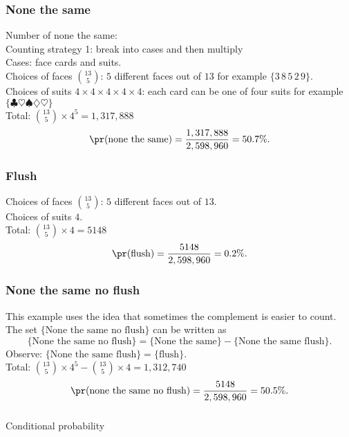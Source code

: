 \begin{frame}[fragile]\frametitle{None the same}

Number of none the same: \\ 

Counting strategy 1: break into cases and then multiply \\
Cases: face cards and suits. \\ 
Choices of faces $\binom{13}{5}$: $5$ different faces out of $13$ for
example $\{3 \,8 \, 5 \, 2 \, 9\}$. \\ 
Choices of suits $4 \times 4 \times 4 \times 4 \times 4$: each card
can be one of four suits  for example $\{\clubsuit \heartsuit \spadesuit
\diamondsuit \heartsuit\}$\\ 
Total: $\binom{13}{5}\times 4^5 = 1,317,888$ \\ 
$$\pr(\mbox{none the same}) = \frac{1,317,888}{2,598,960} = 50.7\%.$$

\end{frame}


\begin{frame}[fragile]\frametitle{Flush}

Choices of faces $\binom{13}{5}$: $5$ different faces out of $13$. \\
Choices of suits $4$. \\
Total: $\binom{13}{5}\times 4 = 5148$ \\ 
$$\pr(\mbox{flush}) = \frac{5148}{2,598,960} = 0.2\%.$$

\end{frame}



\begin{frame}[fragile]\frametitle{None the same no flush}

This example uses the idea that sometimes the complement
is easier to count. \\ 
The set $\{\mbox{None the same no flush}\}$ can be written
as
$$\{\mbox{None the same no flush}\} = \{\mbox{None the same}\} - 
\{\mbox{None the same flush}\}.$$ 
Observe: $\{\mbox{None the same flush}\}=\{\mbox{flush}\}$. \\ 
Total: $\binom{13}{5}\times 4^5 - \binom{13}{5}\times 4 = 1,312,740$ \\ 
$$\pr(\mbox{none the same no flush}) = \frac{5148}{2,598,960} = 50.5\%.$$

\end{frame}


\begin{frame}[fragile]\frametitle{}
\begin{center}
{\Large Conditional probability}

\end{center}
\end{frame}


